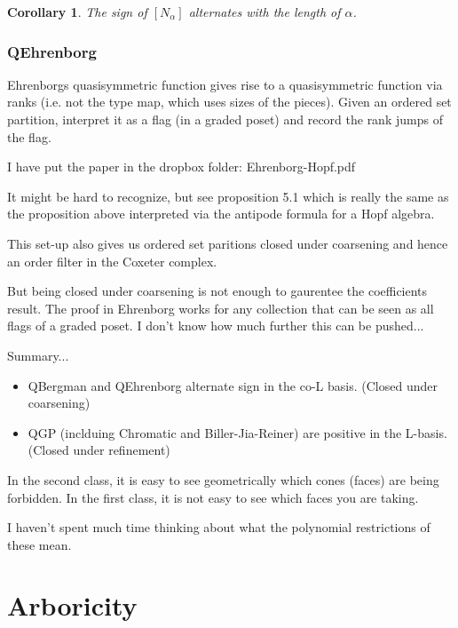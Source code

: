 \documentclass[12pt]{amsart}
\newtheorem{corollary}[definition]{Corollary}
\begin{document}
\begin{corollary}
The sign of $[N_{\alpha}]$ alternates with the length of $\alpha$.  

\end{corollary}



\subsubsection{QEhrenborg}

Ehrenborgs quasisymmetric function gives rise to a quasisymmetric function via ranks (i.e. not the type map, which uses sizes of the pieces).  Given an ordered set partition, interpret it as a flag (in a graded poset) and record the rank jumps of the flag.  

I have put the paper in the dropbox folder: Ehrenborg-Hopf.pdf  

It might be hard to recognize, but see proposition 5.1 which is really the same as the proposition above interpreted via the antipode formula for a Hopf algebra. 

This set-up also gives us ordered set paritions closed under coarsening and hence an order filter in the Coxeter complex. 

But being closed under coarsening is not enough to gaurentee the coefficients result.  The proof in Ehrenborg works for any collection that can be seen as all flags of a graded poset.  I don't know how much further this can be pushed...  


Summary...

\begin{itemize}

\item QBergman and QEhrenborg alternate sign in the co-L basis.  (Closed under coarsening)

\item QGP (inclduing Chromatic and Biller-Jia-Reiner) are positive in the L-basis.  (Closed under refinement)

\end{itemize}

In the second class, it is easy to see geometrically which cones (faces) are being forbidden.  In the first class, it is not easy to see which faces you are taking.  

I haven't spent much time thinking about what the polynomial restrictions of these mean.  

\section{Arboricity}
\end{document}
